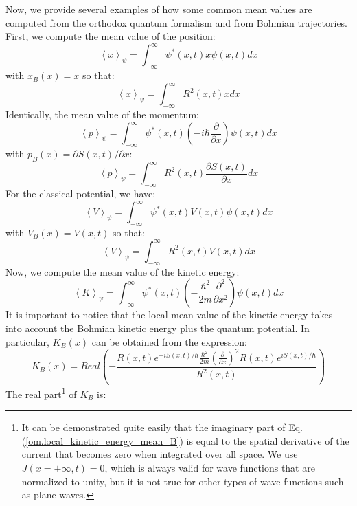 \documentclass[onecolumn,nofootinbib, secnumarabic, amsmath, nobibnotes,11pt,aps,pra]{revtex4-1}
\newcommand{\eref}[1]{Eq. (\ref{#1})}
\newcommand{\avg}[1]{\left\langle #1 \right\rangle} %
\begin{document}
Now, we provide several examples of how some common mean values are
computed from the orthodox quantum formalism and from Bohmian
trajectories. First, we compute the mean value of the position:
\begin{equation}
\label{om.position_mean_0}
\avg{x}_{\psi} = \int_{-\infty}^{\infty} \psi^{*}(x,t) x \psi(x,t) dx
\end{equation}
with $x_B(x) = x$ so that:
\begin{equation}
\label{om.position_mean_B}
\avg{x}_{\psi} = \int_{-\infty}^{\infty} R^2(x,t) x dx
\end{equation}
Identically, the mean value of the momentum:
\begin{equation}
\label{om.momentum_mean_0}
\avg{p}_{\psi} = \int_{-\infty}^{\infty} \psi^{*}(x,t) \left(-i\hbar \frac {\partial} {\partial x}\right) \psi(x,t) dx
\end{equation}
with $p_B(x) = {\partial S(x,t)}/{\partial x}$:
\begin{equation}
\label{om.momentum_mean_B}
\avg{p}_{\psi} = \int_{-\infty}^{\infty} R^2(x,t) \frac {\partial S(x,t)} {\partial x} dx
\end{equation}
For the classical potential, we have:
\begin{equation}
\label{om.Potential_energy_mean_0}
\avg{V}_{\psi} = \int_{-\infty}^{\infty} \psi^{*}(x,t) V(x,t) \psi(x,t) dx
\end{equation}
with $V_B(x) = V(x,t)$ so that:
\begin{equation}
\label{om.Potential_energy_mean_B}
\avg{V}_{\psi} = \int_{-\infty}^{\infty} R^2(x,t) V(x,t) dx
\end{equation}
Now, we compute the mean value of the kinetic energy:
\begin{equation}
\label{om.kinetic_energy_mean_0}
\avg{K}_{\psi} = \int_{-\infty}^{\infty} \psi^{*}(x,t) \left(-\frac {\hbar^2} {2m} \frac {\partial^2} {\partial x^2}\right) \psi(x,t) dx
\end{equation}
It is important to notice that the local mean value of the kinetic
energy takes into account the Bohmian kinetic energy plus the
quantum potential. In particular, $K_B(x)$ can be obtained from the
expression:
\begin{equation}
\label{om.local_kinetic_energy_mean_B}
K_B(x) = Real \left( -\frac {R(x,t) e^{-iS(x,t)/\hbar} \frac{\hbar^2} {2m} \left( \frac {\partial} {\partial x} \right)^2 R(x,t) e^{iS(x,t)/\hbar}} {R^2(x,t)} \right)
\end{equation}
The real part\footnote{It can be demonstrated quite easily that the imaginary part of \eref{om.local_kinetic_energy_mean_B} is equal to the spatial derivative of the current that becomes zero when integrated over all space. We use $J(x = \pm\infty,t) = 0$, which is always valid for wave functions that are normalized to unity, but it is not true for other types of wave functions such as plane waves.} of $K_B$ is:
\end{document}
